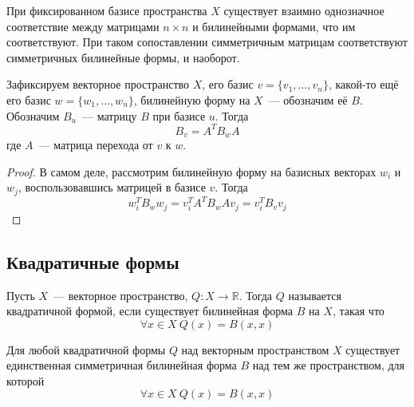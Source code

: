 \documentclass[11pt]{article}
\begin{document}
    \begin{remark}
    При фиксированном базисе пространства $X$ существует взаимно однозначное соответствие между матрицами $n \times n$ и билинейными формами, что им соответствуют. При таком сопоставлении симметричным матрицам соответствуют симметричных билинейные формы, и наоборот.
    \end{remark}

    \vspace{15pt}

    Зафиксируем векторное пространство $X$, его базис $v = \{v_1, \hdots, v_n\}$, какой-то ещё его базис $w = \{w_1, \hdots, w_n\}$, билинейную форму на $X$~--- обозначим её $B$. Обозначим $B_u$~--- матрицу $B$ при базисе $u$. Тогда
    \begin{equation*}
        B_v = A^{T} B_w A
    \end{equation*}
    где $A$~--- матрица перехода от $v$ к $w$.

    \begin{proof}
    В самом деле, рассмотрим билинейную форму на базисных векторах $w_i$ и $w_j$, воспользовавшись матрицей в базисе $v$. Тогда
    \begin{equation*}
        w_i^{T} B_w w_j = v_{i}^{T} A^T B_w A v_j = v_{i}^{T} B_v v_{j}
    \end{equation*}
    \end{proof}

    \newpage

    \subsection{Квадратичные формы}

    \begin{definition}
    Пусть $X$~--- векторное пространство, $Q: X \to \mathbb{R}$. Тогда $Q$ называется квадратичной формой, если существует билинейная форма $B$ на $X$, такая что
    \begin{equation*}
        \forall x \in X \ Q(x) = B(x, x)
    \end{equation*}
    \end{definition}

    \begin{theorem}
    Для любой квадратичной формы $Q$ над векторным пространством $X$ существует единственная симметричная билинейная форма $B$ над тем же пространством, для которой
    \begin{equation*}
        \forall x \in X \ Q(x) = B(x, x)
    \end{equation*}
    \end{theorem}
\end{document}
